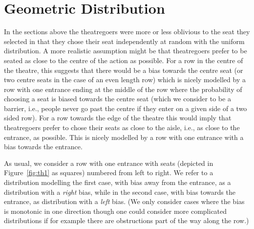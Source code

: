 \documentclass[11pt]{llncs}
\begin{document}
\begin{comment}
As an immediate corollary,
using the expansion of  in a Taylor series (in the variable )
we derive the following result.

\begin{corollary}
For firxed ,
the
expected number  of occupied seats in an arrangement of  seats
in a row having two entrances 
with probabilistically -courteous
theatregoers is given by the expression

asymptotically in .
\qed
\end{corollary}
\end{comment}






\section{Geometric Distribution}
\label{geo:sec}

In the sections above the theatregoers were more or less oblivious
to the seat they selected in that they chose their
seat independently at random with the uniform distribution. A
more realistic assumption might be that theatregoers prefer to be
seated as close to the centre of the action as possible. For a row
in the centre of the theatre, this suggests that there would be
a bias towards the centre seat (or two centre seats in the case of an even
length row) which is nicely modelled by a row with one entrance ending
at the middle of the row
where the probability of choosing a seat is biased towards the centre seat (which
we consider to be a barrier, i.e., people never go past the centre if they enter
on a given side of a two sided row).  
For a row towards the edge of the theatre this would imply that
theatregoers prefer to chose their seats as close to the aisle, i.e.,
as close to the entrance, as possible. This is nicely modelled by
a row with one entrance with a bias towards the entrance. 

As usual, we consider a row with one entrance with  seats
(depicted in Figure~\ref{fig:th1} as squares) 
numbered  from left to right.
We
refer to a distribution modelling the first case, with bias away from the entrance, as a
distribution with a {\em right} bias, while in the second case, with bias towards
the entrance, as distribution with a {\em left} bias. (We only consider cases where
the bias is monotonic in one direction though one could consider more 
complicated distributions if for example there are obstructions part of the way 
along the row.)
\end{document}
